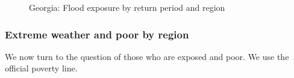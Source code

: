 \documentclass[
  letterpaper,
  DIV=11,
  numbers=noendperiod]{scrartcl}
\begin{document}
\begin{figure}[H]


\caption{\label{fig-floods-exposure}Georgia: Flood exposure by return
period and region}

\end{figure}%

\subsubsection{Extreme weather and poor by
region}\label{extreme-weather-and-poor-by-region}

We now turn to the question of those who are exposed and poor. We use
the official poverty line.
\end{document}
